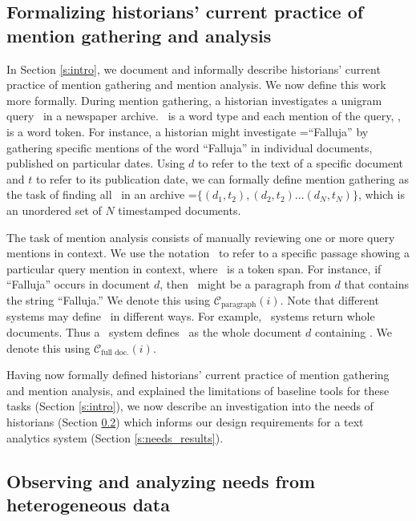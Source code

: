 
\subsection{Formalizing historians' current practice of mention gathering and analysis}\label{s:needs_formal_problem}
In Section \ref{s:intro}, we document and informally describe historians' current practice of mention gathering and mention analysis.
We now define this work more formally. 
During mention gathering, a historian investigates a unigram query \Q~in a newspaper archive.
\Q~is a word type and each mention of the query, \specificmention, is a word token.
For instance, a historian might investigate \Q=``Falluja'' by gathering specific mentions of the word ``Falluja'' in individual documents, published on particular dates.
Using $d$ to refer to the text of a specific document and $t$ to refer to its publication date, we can formally define mention gathering as the task of finding all \mentions~in an archive \archive=$\{(d_1, t_2), (d_2, t_2) ... (d_N, t_N)\}$, which is an unordered set of $N$ timestamped documents.

The task of mention analysis consists of manually reviewing one or more query mentions in context.
We use the notation \mentionincontext~to refer to a specific passage showing a particular query mention in context, where \mentionincontext~is a token span. 
For instance, if ``Falluja'' occurs in document $d$, then \mentionincontext~might be a paragraph from $d$ that contains the string ``Falluja.'' We denote this using $\mathcal{C}_{\text{paragraph}}(i)$.
Note that different systems may define \mentionincontext~in different ways.
For example, \Baselongname~systems return whole documents.
Thus a \Baselongname~system defines \mentionincontext~as the whole document $d$ containing \specificmention.
We denote this using $\mathcal{C}_{\text{full doc.}}(i)$.

Having now formally defined historians' current practice of mention gathering and mention analysis, and explained the limitations of baseline tools for these tasks (Section \ref{s:intro}), we now describe an investigation into the needs of historians (Section \ref{s:needs_protocol}) which informs our design requirements for a text analytics system (Section \ref{s:needs_results}). 


\subsection{Observing and analyzing needs from heterogeneous data}\label{s:needs_protocol}

